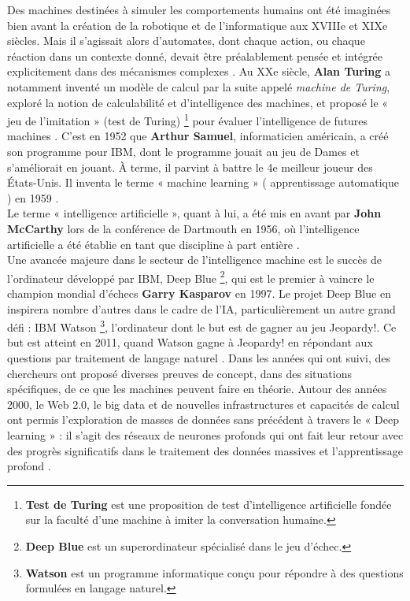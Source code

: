 Des machines destinées à simuler les comportements humains ont été imaginées bien avant la création de la robotique et de l’informatique aux XVIIIe et XIXe siècles. Mais il s’agissait alors d’automates, dont chaque action, ou chaque réaction dans un contexte donné, devait être préalablement pensée et intégrée explicitement dans des mécanismes complexes \cite{boisard2020}.
Au XXe siècle, \textbf{Alan Turing} a notamment inventé un modèle de calcul par la suite appelé \textit{machine de Turing}, exploré la notion de calculabilité et d'intelligence des machines, et proposé le « jeu de l'imitation » (test de Turing\textsuperscript{}) \footnote{\textbf{Test de Turing} est une proposition de test d’intelligence artificielle fondée sur la faculté d'une machine à imiter la conversation humaine.} pour évaluer l'intelligence de futures machines \cite{turing1950}. C'est en 1952 que \textbf{Arthur Samuel}, informaticien américain, a créé son programme pour IBM, dont le programme jouait au jeu de Dames et s'améliorait en jouant. À terme, il parvint à battre le 4e meilleur joueur des États-Unis. Il inventa le terme « machine learning » ( apprentissage automatique ) en 1959 \cite{samuel}. 
\\
Le terme « intelligence artificielle », quant à lui, a été mis en avant par \textbf{John McCarthy} lors de la conférence de Dartmouth en 1956, où l'intelligence artificielle a été établie en tant que discipline à part entière \cite{mccarthy1956}.
\\
Une avancée majeure dans le secteur de l'intelligence machine est le succès de l'ordinateur développé par IBM, Deep Blue\textsuperscript{} \footnote{\textbf{Deep Blue} est un superordinateur spécialisé dans le jeu d'échec.}, qui est le premier à vaincre le champion mondial d'échecs \textbf{Garry Kasparov} en 1997. Le projet Deep Blue en inspirera nombre d'autres dans le cadre de l'IA, particulièrement un autre grand défi : IBM Watson\textsuperscript{} \footnote{\textbf{Watson} est un programme informatique conçu pour répondre à des questions formulées en langage naturel.}, l'ordinateur dont le but est de gagner au jeu Jeopardy!. Ce but est atteint en 2011, quand Watson gagne à Jeopardy! en répondant aux questions par traitement de langage naturel \cite{wiki_ml}.
Dans les années qui ont suivi, des chercheurs ont proposé diverses preuves de concept, dans des situations spécifiques, de ce que les machines peuvent faire en théorie. Autour des années 2000, le Web 2.0, le big data et de nouvelles infrastructures et capacités de calcul ont permis l'exploration de masses de données sans précédent à travers le « Deep learning » : il s'agit des réseaux de neurones profonds qui ont fait leur retour avec des progrès significatifs dans le traitement des données massives et l'apprentissage profond \cite{lecun2015}.
